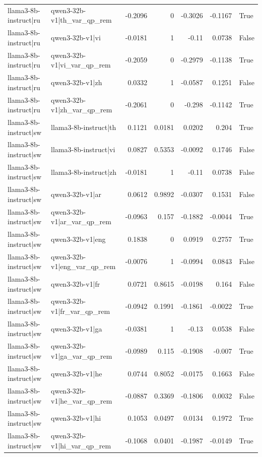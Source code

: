 \begin{table}
\begin{tabular}{l l r r r r l}
llama3-8b-instruct|ru & qwen3-32b-v1|th_var_qp_rem & -0.2096 & 0 & -0.3026 & -0.1167 & True \\
llama3-8b-instruct|ru & qwen3-32b-v1|vi & -0.0181 & 1 & -0.11 & 0.0738 & False \\
llama3-8b-instruct|ru & qwen3-32b-v1|vi_var_qp_rem & -0.2059 & 0 & -0.2979 & -0.1138 & True \\
llama3-8b-instruct|ru & qwen3-32b-v1|zh & 0.0332 & 1 & -0.0587 & 0.1251 & False \\
llama3-8b-instruct|ru & qwen3-32b-v1|zh_var_qp_rem & -0.2061 & 0 & -0.298 & -0.1142 & True \\
llama3-8b-instruct|sw & llama3-8b-instruct|th & 0.1121 & 0.0181 & 0.0202 & 0.204 & True \\
llama3-8b-instruct|sw & llama3-8b-instruct|vi & 0.0827 & 0.5353 & -0.0092 & 0.1746 & False \\
llama3-8b-instruct|sw & llama3-8b-instruct|zh & -0.0181 & 1 & -0.11 & 0.0738 & False \\
llama3-8b-instruct|sw & qwen3-32b-v1|ar & 0.0612 & 0.9892 & -0.0307 & 0.1531 & False \\
llama3-8b-instruct|sw & qwen3-32b-v1|ar_var_qp_rem & -0.0963 & 0.157 & -0.1882 & -0.0044 & True \\
llama3-8b-instruct|sw & qwen3-32b-v1|eng & 0.1838 & 0 & 0.0919 & 0.2757 & True \\
llama3-8b-instruct|sw & qwen3-32b-v1|eng_var_qp_rem & -0.0076 & 1 & -0.0994 & 0.0843 & False \\
llama3-8b-instruct|sw & qwen3-32b-v1|fr & 0.0721 & 0.8615 & -0.0198 & 0.164 & False \\
llama3-8b-instruct|sw & qwen3-32b-v1|fr_var_qp_rem & -0.0942 & 0.1991 & -0.1861 & -0.0022 & True \\
llama3-8b-instruct|sw & qwen3-32b-v1|ga & -0.0381 & 1 & -0.13 & 0.0538 & False \\
llama3-8b-instruct|sw & qwen3-32b-v1|ga_var_qp_rem & -0.0989 & 0.115 & -0.1908 & -0.007 & True \\
llama3-8b-instruct|sw & qwen3-32b-v1|he & 0.0744 & 0.8052 & -0.0175 & 0.1663 & False \\
llama3-8b-instruct|sw & qwen3-32b-v1|he_var_qp_rem & -0.0887 & 0.3369 & -0.1806 & 0.0032 & False \\
llama3-8b-instruct|sw & qwen3-32b-v1|hi & 0.1053 & 0.0497 & 0.0134 & 0.1972 & True \\
llama3-8b-instruct|sw & qwen3-32b-v1|hi_var_qp_rem & -0.1068 & 0.0401 & -0.1987 & -0.0149 & True \\

\end{tabular}
\end{table}
